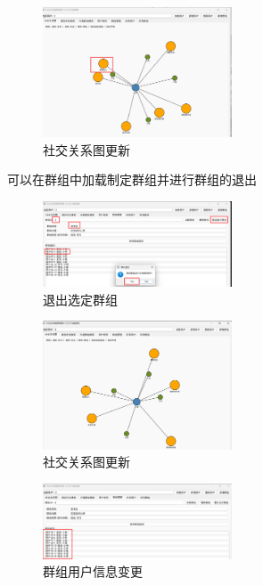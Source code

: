 \documentclass[12pt,a4paper]{article}
\begin{document}
\begin{figure}[H]
    \centering
    \includegraphics[width=0.5\textwidth]{pt2-27.png}
    \caption{社交关系图更新}
\end{figure}

可以在群组中加载制定群组并进行群组的退出

\begin{figure}[H]
    \centering
    \includegraphics[width=0.5\textwidth]{pt2-28.png}
    \caption{退出选定群组}
\end{figure}

\begin{figure}[H]
    \centering
    \includegraphics[width=0.5\textwidth]{pt2-29.png}
    \caption{社交关系图更新}
\end{figure}

\begin{figure}[H]
    \centering
    \includegraphics[width=0.5\textwidth]{pt2-30.png}
    \caption{群组用户信息变更}
\end{figure}
\end{document}
